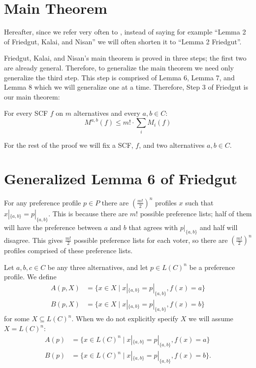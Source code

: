 \section{Main Theorem}

	Hereafter, since we refer very often to \cite{friedgut2008elections}, instead of saying for example ``Lemma 2 of Friedgut, Kalai, and Nisan'' we will often shorten it to ``Lemma 2 Friedgut''.

	Friedgut, Kalai, and Nisan's main theorem is proved in three steps; the first two are already general. Therefore, to generalize the main theorem we need only generalize the third step. This step is comprised of Lemma 6, Lemma 7, and Lemma 8 which we will generalize one at a time. Therefore, Step 3 of Friedgut is our main theorem:

	\begin{theorem}
		For every SCF $f$ on $m$ alternatives and every $a, b \in C$:
		\[
			M^{a, b}(f) \le m! \cdot \sum_i M_i(f)
		\]
	\end{theorem}

	For the rest of the proof we will fix a SCF, $f$, and two alternatives $a, b \in C$.


\section{Generalized Lemma 6 of Friedgut}

	For any preference profile $p \in P$ there are $(\frac{m!}{2})^n$ profiles $x$ such that $x|_{\{a, b\}} = p|_{\{a, b\}}$. This is because there are $m!$ possible preference lists; half of them will have the preference between $a$ and $b$ that agrees with $p|_{\{a, b\}}$ and half will disagree. This gives $\frac{m!}{2}$ possible preference lists for each voter, so there are $(\frac{m!}{2})^n$ profiles comprised of these preference lists.

	\begin{definition}
		Let $a, b, c \in C$ be any three alternatives, and let $p \in L(C)^n$ be a preference profile. We define
		\begin{align*}
			A(p, X) &= \{x \in X \mid x|_{\{a,b\}} = p|_{\{a,b\}}, f(x) = a\} \\
			B(p, X) &= \{x \in X \mid x|_{\{a,b\}} = p|_{\{a,b\}}, f(x) = b\}
		\end{align*}
		for some $X \subseteq L(C)^n$. When we do not explicitly specify $X$ we will assume $X = L(C)^n$:
		\begin{align*}
			A(p) &= \{x \in L(C)^n \mid x|_{\{a,b\}} = p|_{\{a,b\}}, f(x) = a\} \\
			B(p) &= \{x \in L(C)^n \mid x|_{\{a,b\}} = p|_{\{a,b\}}, f(x) = b\}.
		\end{align*}
	\end{definition}

